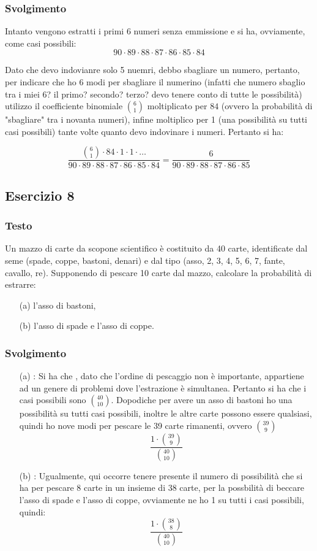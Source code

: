 \subsubsection{Svolgimento}

Intanto vengono estratti i primi 6 numeri senza emmissione e si ha, ovviamente, come casi possibili:
\[
  90\cdot 89 \cdot 88 \cdot 87 \cdot 86 \cdot 85 \cdot 84
\]

Dato che devo indovianre solo 5 nuemri, debbo sbagliare un numero, pertanto, per indicare che ho 6 modi per sbagliare il numerino (infatti che numero sbaglio tra i miei 6? il primo? secondo? terzo? devo tenere conto di tutte le possibilità) utilizzo il coefficiente binomiale $\binom{6}{1}$ moltiplicato per $84$ (ovvero la probabilità di "sbagliare" tra i novanta numeri), infine moltiplico per 1 (una possibilità su tutti casi possibili) tante volte quanto devo indovinare i numeri. Pertanto si ha:  

\[
  \frac{\binom{6}{1}\cdot 84 \cdot 1 \cdot 1 \cdot \dots}{90\cdot 89 \cdot 88 \cdot 87 \cdot 86 \cdot 85 \cdot 84} = \frac{6}{90\cdot 89 \cdot 88 \cdot 87 \cdot 86 \cdot 85 }
\]
\subsection{Esercizio 8}
\subsubsection{Testo}
Un mazzo di carte da scopone scientifico è costituito da 40 carte, identificate dal seme (spade, coppe, bastoni, denari) e dal tipo (asso, 2, 3, 4, 5, 6, 7, fante, cavallo, re). Supponendo di pescare 10 carte dal mazzo, calcolare la probabilità di estrarre:
\begin{itemize}
    \item[(a)] l'asso di bastoni,
    \item[(b)] l'asso di spade e l'asso di coppe.
\end{itemize}

\subsubsection{Svolgimento}

\begin{itemize}
  \item[(a)]: Si ha che , dato che l'ordine di pescaggio non è importante, appartiene ad un genere di problemi dove l'estrazione è simultanea. Pertanto si ha che i casi possibili sono $\binom{40}{10}$. Dopodiche per avere un asso di bastoni ho una possibilità su tutti casi possibili, inoltre le altre carte possono essere qualsiasi, quindi ho nove modi per pescare le 39 carte rimanenti, ovvero $\binom{39}{9}$
  \[
    \frac{1\cdot\binom{39}{9} }{\binom{40}{10}}
  \]
  \item[(b)]: Ugualmente, qui occorre tenere presente il numero di possibilità che si ha per pescare 8 carte in un insieme di 38 carte, per la possbilità di beccare l'asso di spade e l'asso di coppe, ovviamente ne ho 1 su tutti i casi possibili, quindi: 
  \[
    \frac{1\cdot \binom{38}{8}}{\binom{40}{10}}
  \]

\end{itemize}

